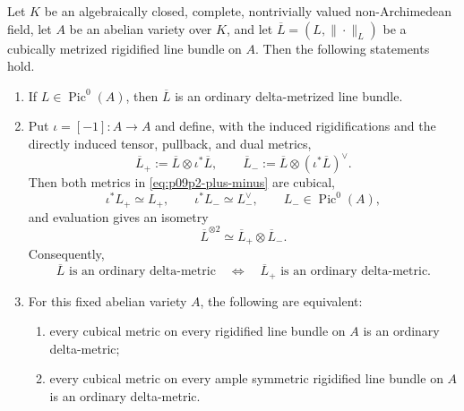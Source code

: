 \begin{theorem}
\label{thm:p09p2-reduction}
Let \(K\) be an algebraically closed, complete, nontrivially valued
non-Archimedean field, let \(A\) be an abelian variety over \(K\), and let
\(\overline L=(L,\|\cdot\|_L)\) be a cubically metrized rigidified line
bundle on \(A\).
Then the following statements hold.
\begin{enumerate}
\item\label{itm:p09p2-pic0}
 If \(L\in\operatorname{Pic}^0(A)\), then \(\overline L\) is an ordinary
 delta-metrized line bundle.

\item\label{itm:p09p2-split}
 Put \(\iota=[-1]:A\to A\) and define, with the induced rigidifications
 and the directly induced tensor, pullback, and dual metrics,
 \begin{equation}
 \label{eq:p09p2-plus-minus}
  \overline L_+
    :=\overline L\otimes\iota^*\overline L,
  \qquad
  \overline L_-
    :=\overline L\otimes(\iota^*\overline L)^\vee.
 \end{equation}
 Then both metrics in \eqref{eq:p09p2-plus-minus} are cubical,
 \begin{equation}
 \label{eq:p09p2-symmetry}
  \iota^*L_+\simeq L_+,
  \qquad
  \iota^*L_-\simeq L_-^\vee,
  \qquad
  L_-\in\operatorname{Pic}^0(A),
 \end{equation}
 and evaluation gives an isometry
 \begin{equation}
 \label{eq:p09p2-square-split}
       \overline L^{\otimes2}
       \simeq
       \overline L_+\otimes\overline L_-.
 \end{equation}
 Consequently,
 \begin{equation}
 \label{eq:p09p2-delta-equivalence}
  \overline L\text{ is an ordinary delta-metric}
  \quad\Longleftrightarrow\quad
  \overline L_+\text{ is an ordinary delta-metric}.
 \end{equation}

\item\label{itm:p09p2-ample-reduction}
 For this fixed abelian variety \(A\), the following are equivalent:
 \begin{enumerate}
 \item\label{itm:p09p2-all}
 every cubical metric on every rigidified line bundle on \(A\) is an ordinary
 delta-metric;
 \item\label{itm:p09p2-ample-symmetric}
 every cubical metric on every ample symmetric rigidified line bundle on
 \(A\) is an ordinary delta-metric.
 \end{enumerate}
\end{enumerate}
\end{theorem}
